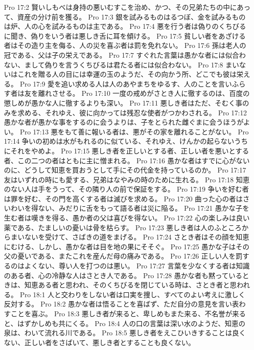 Pro 17:2  賢いしもべは身持の悪いむすこを治め、かつ、その兄弟たちの中にあって、資産の分け前を獲る。
Pro 17:3  銀を試みるものはるつぼ、金を試みるものは炉、人の心を試みるものは主である。
Pro 17:4  悪を行う者は偽りのくちびるに聞き、偽りをいう者は悪しき舌に耳を傾ける。
Pro 17:5  貧しい者をあざける者はその造り主を侮る、人の災を喜ぶ者は罰を免れない。
Pro 17:6  孫は老人の冠である、父は子の栄えである。
Pro 17:7  すぐれた言葉は愚かな者には似合わない、まして偽りを言うくちびるは君たる者には似合わない。
Pro 17:8  まいないはこれを贈る人の目には幸運の玉のようだ、その向かう所、どこでも彼は栄える。
Pro 17:9  愛を追い求める人は人のあやまちをゆるす、人のことを言いふらす者は友を離れさせる。
Pro 17:10  一度の戒めがさとき人に徹するのは、百度の懲しめが愚かな人に徹するよりも深い。
Pro 17:11  悪しき者はただ、そむく事のみを求める、それゆえ、彼に向かっては残忍な使者がつかわされる。
Pro 17:12  愚かな者が愚かな事をするのに会うよりは、子をとられた雌ぐまに会うほうがよい。
Pro 17:13  悪をもて善に報いる者は、悪がその家を離れることがない。
Pro 17:14  争いの初めは水がもれるのに似ている、それゆえ、けんかの起らないうちにそれをやめよ。
Pro 17:15  悪しき者を正しいとする者、正しい者を悪いとする者、この二つの者はともに主に憎まれる。
Pro 17:16  愚かな者はすでに心がないのに、どうして知恵を買おうとして手にその代金を持っているのか。
Pro 17:17  友はいずれの時にも愛する、兄弟はなやみの時のために生れる。
Pro 17:18  知恵のない人は手をうって、その隣り人の前で保証をする。
Pro 17:19  争いを好む者は罪を好む、その門を高くする者は滅びを求める。
Pro 17:20  曲った心の者はさいわいを得ない、みだりに舌をもって語る者は災に陥る。
Pro 17:21  愚かな子を生む者は嘆きを得る、愚か者の父は喜びを得ない。
Pro 17:22  心の楽しみは良い薬である、たましいの憂いは骨を枯らす。
Pro 17:23  悪しき者は人のふところからまいないを受けて、さばきの道をまげる。
Pro 17:24  さとき者はその顔を知恵にむける、しかし、愚かな者は目を地の果にそそぐ。
Pro 17:25  愚かな子はその父の憂いである、またこれを産んだ母の痛みである。
Pro 17:26  正しい人を罰するのはよくない、尊い人を打つのは悪い。
Pro 17:27  言葉を少なくする者は知識のある者、心の冷静な人はさとき人である。
Pro 17:28  愚かな者も黙っているときは、知恵ある者と思われ、そのくちびるを閉じている時は、さとき者と思われる。
Pro 18:1  人と交わりをしない者は口実を捜し、すべてのよい考えに激しく反対する。
Pro 18:2  愚かな者は悟ることを喜ばず、ただ自分の意見を言い表わすことを喜ぶ。
Pro 18:3  悪しき者が来ると、卑しめもまた来る、不名誉が来ると、はずかしめも共にくる。
Pro 18:4  人の口の言葉は深い水のようだ、知恵の泉は、わいて流れる川である。
Pro 18:5  悪しき者をえこひいきすることは良くない、正しい者をさばいて、悪しき者とすることも良くない。
